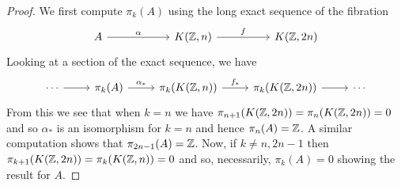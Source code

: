 \documentclass[../main.tex]{subfiles}
\begin{document}
\begin{proof}
   We first compute \( \pi_k(A) \) using the long exact sequence
   of the fibration
   \begin{equation}
      \begin{tikzcd}
          A & {} & {K(\Z, n)} && {K(\Z, 2n)}
          \arrow[""{name=0, anchor=center, inner sep=0}, "\alpha", from=1-1, to=1-3]
          \arrow["f", from=1-3, to=1-5]
      \end{tikzcd}
   \end{equation}
   Looking at a section of the exact sequence, we have
   \begin{equation}
      \begin{tikzcd}
          \cdots & {\pi_k(A)} & {\pi_k(K(\Z, n))} & {\pi_k(K(\Z,2n))} & \cdots
          \arrow[from=1-4, to=1-5]
          \arrow["{f_*}", from=1-3, to=1-4]
          \arrow["{\alpha_*}", from=1-2, to=1-3]
          \arrow[from=1-1, to=1-2]
      \end{tikzcd}
   \end{equation}
   From this we see that when \( k=n \) we have \( \pi_{n+1}(K(\mathbb{Z}, 2n))=
   \pi_n(K(\mathbb{Z}, 2n))=0\) and so \( \alpha_* \) is an isomorphism for \( k=n \) 
   and hence \( \pi_n(A)=\mathbb{Z} \). A similar computation shows that
   \( \pi_{2n-1}(A)=\mathbb{Z} \). Now, if \( k\neq n, 2n-1 \) then \( \pi_{k+1}(K(\mathbb{Z}, 2n))=\pi_k(K(\mathbb{Z}, n))=0 \)
   and so, necessarily, \( \pi_k(A)=0 \) showing the result for \( A \).


\end{proof}
\end{document}

